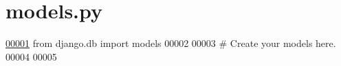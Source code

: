 \hypertarget{models_8py_source}{}\section{models.\+py}
\label{models_8py_source}

\begin{DoxyCode}
\hypertarget{models_8py_source_l00001}{}\hyperlink{namespacecivilsage_1_1models}{00001} \textcolor{keyword}{from} django.db \textcolor{keyword}{import} models
00002 
00003 \textcolor{comment}{# Create your models here.}
00004 
00005 
\end{DoxyCode}
